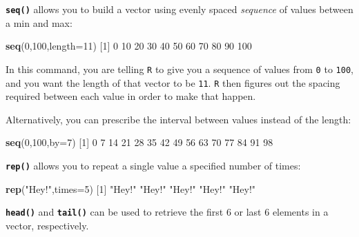 \documentclass[
]{book}
\newenvironment{Shaded}{\begin{snugshade}}{\end{snugshade}}
\newcommand{\DataTypeTok}[1]{\textcolor[rgb]{0.13,0.29,0.53}{#1}}
\newcommand{\DecValTok}[1]{\textcolor[rgb]{0.00,0.00,0.81}{#1}}
\newcommand{\KeywordTok}[1]{\textcolor[rgb]{0.13,0.29,0.53}{\textbf{#1}}}
\newcommand{\NormalTok}[1]{#1}
\newcommand{\StringTok}[1]{\textcolor[rgb]{0.31,0.60,0.02}{#1}}
\begin{document}
\textbf{\texttt{seq()}} allows you to build a vector using evenly spaced \emph{sequence} of values between a min and max:

\begin{Shaded}
\begin{Highlighting}[]
\KeywordTok{seq}\NormalTok{(}\DecValTok{0}\NormalTok{,}\DecValTok{100}\NormalTok{,}\DataTypeTok{length=}\DecValTok{11}\NormalTok{)}
\NormalTok{ [}\DecValTok{1}\NormalTok{]   }\DecValTok{0}  \DecValTok{10}  \DecValTok{20}  \DecValTok{30}  \DecValTok{40}  \DecValTok{50}  \DecValTok{60}  \DecValTok{70}  \DecValTok{80}  \DecValTok{90} \DecValTok{100}
\end{Highlighting}
\end{Shaded}

In this command, you are telling \texttt{R} to give you a sequence of values from \texttt{0} to \texttt{100}, and you want the length of that vector to be \texttt{11}. \texttt{R} then figures out the spacing required between each value in order to make that happen.

Alternatively, you can prescribe the interval between values instead of the length:

\begin{Shaded}
\begin{Highlighting}[]
\KeywordTok{seq}\NormalTok{(}\DecValTok{0}\NormalTok{,}\DecValTok{100}\NormalTok{,}\DataTypeTok{by=}\DecValTok{7}\NormalTok{)}
\NormalTok{ [}\DecValTok{1}\NormalTok{]  }\DecValTok{0}  \DecValTok{7} \DecValTok{14} \DecValTok{21} \DecValTok{28} \DecValTok{35} \DecValTok{42} \DecValTok{49} \DecValTok{56} \DecValTok{63} \DecValTok{70} \DecValTok{77} \DecValTok{84} \DecValTok{91} \DecValTok{98}
\end{Highlighting}
\end{Shaded}

\textbf{\texttt{rep()}} allows you to repeat a single value a specified number of times:

\begin{Shaded}
\begin{Highlighting}[]
\KeywordTok{rep}\NormalTok{(}\StringTok{"Hey!"}\NormalTok{,}\DataTypeTok{times=}\DecValTok{5}\NormalTok{)}
\NormalTok{[}\DecValTok{1}\NormalTok{] }\StringTok{"Hey!"} \StringTok{"Hey!"} \StringTok{"Hey!"} \StringTok{"Hey!"} \StringTok{"Hey!"}
\end{Highlighting}
\end{Shaded}

\textbf{\texttt{head()}} and \textbf{\texttt{tail()}} can be used to retrieve the first 6 or last 6 elements in a vector, respectively.
\end{document}
